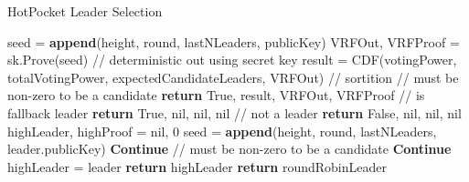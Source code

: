 \documentclass[a4paper]{article}
\begin{document}
\begin{algorithm}
  \caption{HotPocket Leader Selection}
  \begin{algorithmic}[1]
       {\color{Bittersweet} }
         \State seed = \textbf{append}(height, round, lastNLeaders, publicKey)
         {\color{OliveGreen}\State VRFOut, VRFProof = sk.Prove(seed)} // deterministic out using secret key
         {\color{MidnightBlue}\State result = CDF(votingPower, totalVotingPower, expectedCandidateLeaders, VRFOut)} // sortition
          // must be non-zero to be a candidate
           \State \textbf{return} True, result, VRFOut, VRFProof
          // is fallback leader
           \State \textbf{return} True, nil, nil, nil
         \Else \quad // not a leader
         \State \textbf{return} False, nil, nil, nil
         \EndIf
       \EndFunction \\
        {\color{Bittersweet} }
         \State highLeader, highProof = nil, 0
             \State seed = \textbf{append}(height, round, lastNLeaders, leader.publicKey)
               \State \textbf{Continue}
              // must be non-zero to be a candidate
               \State \textbf{Continue}
               \State highLeader = leader
             \EndIf
         \EndFor
            \State \textbf{return} highLeader
         \Else
           \State \textbf{return} roundRobinLeader
         \EndIf
       \EndFunction
  \end{algorithmic}
\end{algorithm}
\end{document}
